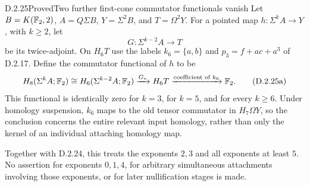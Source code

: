 \begin{claim}{D.2.25}{Proved}{Two further first-cone commutator functionals vanish}
Let $B=K(\mathbb F_2,2)$, $A=Q\Sigma B$, $Y=\Sigma^2B$,
and $T=\Omega^2Y$.  For a pointed map
$h:\Sigma^kA\to Y$, with $k\ge2$, let
\[
 G:\Sigma^{k-2}A\longrightarrow T
\]
be its twice-adjoint.  On $H_6T$ use the labels
$k_6=\{a,b\}$ and $p_3=f+ac+a^3$ of D.2.17.
Define the commutator functional of $h$ to be
\[
 H_8(\Sigma^kA;\mathbb F_2)
   \cong H_6(\Sigma^{k-2}A;\mathbb F_2)
   \xrightarrow{G_*}H_6T
   \xrightarrow{\text{coefficient of }k_6}\mathbb F_2.
 \tag{D.2.25a}
\]
This functional is identically zero for $k=3$, for $k=5$,
and for every $k\ge6$.
Under homology suspension, $k_6$ maps to the old tensor
commutator in $H_7\Omega Y$, so the conclusion concerns the
entire relevant input homology, rather than only the kernel
of an individual attaching homology map.

Together with D.2.24, this treats the exponents $2,3$ and
all exponents at least $5$.  No assertion for exponents
$0,1,4$, for arbitrary simultaneous attachments involving
those exponents, or for later nullification stages is made.
\end{claim}
